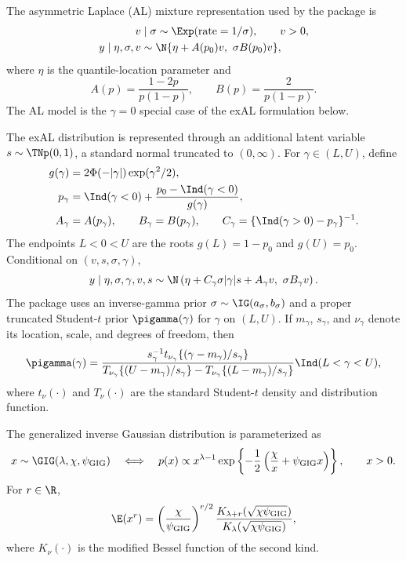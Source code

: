 The asymmetric Laplace (AL) mixture representation used by the package is
\begin{align}
v &\mid \sigma \sim \Exp(\text{rate}=1/\sigma), \qquad v>0, \\
y \mid \eta,\sigma,v
&\sim \N\{ \eta + A(p_0)v,\ \sigma B(p_0)v \},
\end{align}
where $\eta$ is the quantile-location parameter and
\begin{equation}
A(p)=\frac{1-2p}{p(1-p)}, \qquad B(p)=\frac{2}{p(1-p)}.
\label{eq:al_AB}
\end{equation}
The AL model is the $\gamma=0$ special case of the exAL formulation below.

The exAL distribution is represented through an additional latent variable
$s\sim\TNp(0,1)$, a standard normal truncated to $(0,\infty)$. For
$\gamma\in(L,U)$, define
\begin{align}
g(\gamma) &= 2\Phi(-|\gamma|)\exp(\gamma^2/2), \\
p_\gamma &= \Ind(\gamma<0) + \frac{p_0-\Ind(\gamma<0)}{g(\gamma)}, \\
A_\gamma &= A(p_\gamma), \qquad
B_\gamma = B(p_\gamma), \qquad
C_\gamma = \{\Ind(\gamma>0)-p_\gamma\}^{-1}.
\label{eq:exal_ABC}
\end{align}
The endpoints $L<0<U$ are the roots $g(L)=1-p_0$ and $g(U)=p_0$. Conditional on
$(v,s,\sigma,\gamma)$,
\begin{equation}
y\mid \eta,\sigma,\gamma,v,s
\sim
\N\left(\eta + C_\gamma\sigma|\gamma|s + A_\gamma v,\ 
\sigma B_\gamma v \right).
\label{eq:exal_aug}
\end{equation}
The package uses an inverse-gamma prior $\sigma\sim\IG(a_\sigma,b_\sigma)$
and a proper truncated Student-$t$ prior $\pigamma(\gamma)$ for $\gamma$ on
$(L,U)$. If $m_\gamma$, $s_\gamma$, and $\nu_\gamma$ denote its location,
scale, and degrees of freedom, then
\begin{equation}
\pigamma(\gamma)=
\frac{
s_\gamma^{-1}t_{\nu_\gamma}\{(\gamma-m_\gamma)/s_\gamma\}
}{
T_{\nu_\gamma}\{(U-m_\gamma)/s_\gamma\}
-T_{\nu_\gamma}\{(L-m_\gamma)/s_\gamma\}
}\Ind(L<\gamma<U),
\label{eq:gamma_prior}
\end{equation}
where $t_\nu(\cdot)$ and $T_\nu(\cdot)$ are the standard Student-$t$ density
and distribution function.

The generalized inverse Gaussian distribution is parameterized as
\begin{equation}
x\sim\GIG(\lambda,\chi,\psi_{\mathrm{GIG}})
\quad\Longleftrightarrow\quad
p(x)\propto x^{\lambda-1}
\exp\left\{-\frac{1}{2}\left(\frac{\chi}{x}+\psi_{\mathrm{GIG}} x\right)\right\},
\qquad x>0.
\label{eq:gig_parameterization}
\end{equation}
For $r\in\R$,
\begin{equation}
\E(x^r)=
\left(\frac{\chi}{\psi_{\mathrm{GIG}}}\right)^{r/2}
\frac{K_{\lambda+r}(\sqrt{\chi\psi_{\mathrm{GIG}}})}
{K_{\lambda}(\sqrt{\chi\psi_{\mathrm{GIG}}})},
\label{eq:gig_moments}
\end{equation}
where $K_\nu(\cdot)$ is the modified Bessel function of the second kind.

